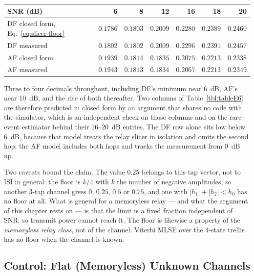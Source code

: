 \begin{center}\small
\begin{tabular}{lrrrrrr}
\toprule
SNR (dB) & 6 & 8 & 12 & 16 & 18 & 20 \\
\midrule
DF closed form, Eq.~\eqref{eq:slicer-floor} & $0.1786$ & $0.1803$ & $0.2009$ & $0.2280$ & $0.2389$ & $0.2460$ \\
DF measured & $0.1802$ & $0.1802$ & $0.2009$ & $0.2296$ & $0.2391$ & $0.2457$ \\
AF closed form & $0.1939$ & $0.1814$ & $0.1835$ & $0.2075$ & $0.2213$ & $0.2338$ \\
AF measured & $0.1943$ & $0.1813$ & $0.1834$ & $0.2067$ & $0.2213$ & $0.2349$ \\
\bottomrule
\end{tabular}
\end{center}

\noindent Three to four decimals throughout, including DF's minimum near 6~dB, AF's near 10~dB, and the rise of both thereafter. Two columns of Table~\ref{tbl:tableE6} are therefore predicted in closed form by an argument that shares no code with the simulator, which is an independent check on those columns and on the rare-event estimator behind their 16--20~dB entries. The DF row alone sits low below 6~dB, because that model treats the relay slicer in isolation and omits the second hop; the AF model includes both hops and tracks the measurement from 0~dB up.

Two caveats bound the claim. The value $0.25$ belongs to this tap vector, not to ISI in general: the floor is $k/4$ with $k$ the number of negative amplitudes, so another 3-tap channel gives $0$, $0.25$, $0.5$ or $0.75$, and one with $|h_1| + |h_2| < h_0$ has no floor at all. What is general for a memoryless relay --- and what the argument of this chapter rests on --- is that the limit is a fixed fraction independent of SNR, so transmit power cannot reach it. The floor is likewise a property of the \emph{memoryless relay class}, not of the channel: Viterbi MLSE over the 4-state trellis has no floor when the channel is known.

\subsection{Control: Flat (Memoryless) Unknown Channels}\label{sec:flat-unknown-channels}

